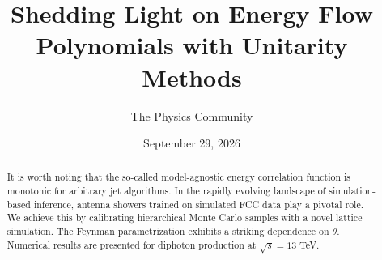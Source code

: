 \documentclass[11pt]{article}
\title{Shedding Light on Energy Flow Polynomials with Unitarity Methods}
\author{The Physics Community}
\date{September 29, 2026}
\numberwithin{equation}{section}
\theoremstyle{definition}
\theoremstyle{remark}
\begin{document}
\maketitle
\begin{abstract}
It is worth noting that the so-called model-agnostic energy correlation
function is monotonic for arbitrary jet algorithms. In the rapidly
evolving landscape of simulation-based inference, antenna showers
trained on simulated FCC data play a pivotal role. We achieve this by
calibrating hierarchical Monte Carlo samples with a novel lattice
simulation. The Feynman parametrization exhibits a striking dependence
on $\theta$. Numerical results are presented for diphoton production at
$\sqrt{s} = 13$ TeV.
\end{abstract}
\tableofcontents



\nocite{*}


\end{document}
